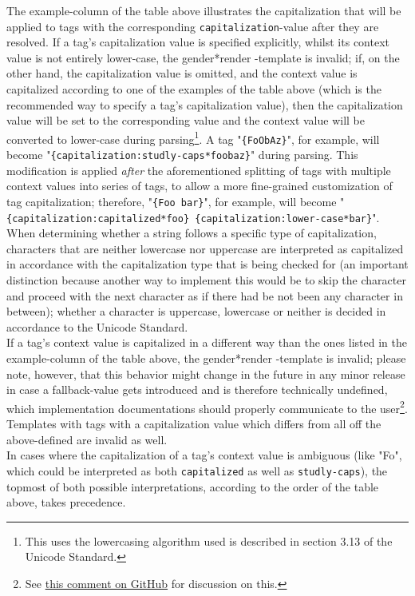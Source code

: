 \documentclass{article}
\newcommand{\GenderRender}{
    gender*render
}
\begin{document}
    The example-column of the table above illustrates the capitalization that will be applied to tags with the corresponding \texttt{capitalization}-value after they are resolved.
    If a tag's capitalization value is specified explicitly, whilst its context value is not entirely lower-case, the \GenderRender-template is invalid;
    if, on the other hand, the capitalization value is omitted, and the context value is capitalized according to one of the examples of the table above (which is the recommended way to specify a tag's capitalization value), then the capitalization value will be set to the corresponding value and the context value will be converted to lower-case during parsing\footnote{This uses the lowercasing algorithm used is described in section 3.13 of the Unicode Standard.}.
    A tag "\texttt{\{FoObAz\}}", for example, will become "\texttt{\{capitalization:studly-caps*foobaz\}}" during parsing.
    This modification is applied \emph{after} the aforementioned splitting of tags with multiple context values into series of tags, to allow a more fine-grained customization of tag capitalization;
    therefore, "\texttt{\{Foo bar\}}", for example, will become "\texttt{\{capitalization:capitalized*foo\} \{capitalization:lower-case*bar\}}".
    When determining whether a string follows a specific type of capitalization, characters that are neither lowercase nor uppercase are interpreted as capitalized in accordance with the capitalization type that is being checked for (an important distinction because another way to implement this would be to skip the character and proceed with the next character as if there had be not been any character in between);
    whether a character is uppercase, lowercase or neither is decided in accordance to the Unicode Standard.\\
    If a tag's context value is capitalized in a different way than the ones listed in the example-column of the table above, the \GenderRender-template is invalid;
    please note, however, that this behavior might change in the future in any minor release in case a fallback-value gets introduced and is therefore technically undefined, which implementation documentations should properly communicate to the user\footnote{See \href{https://github.com/phseiff/gender-render/issues/2\#issuecomment-798799367}{this comment on GitHub} for discussion on this.}.
    Templates with tags with a capitalization value which differs from all off the above-defined are invalid as well.\\
    In cases where the capitalization of a tag's context value is ambiguous (like "Fo", which could be interpreted as both \texttt{capitalized} as well as \texttt{studly-caps}), the topmost of both possible interpretations, according to the order of the table above, takes precedence.\\
\end{document}
